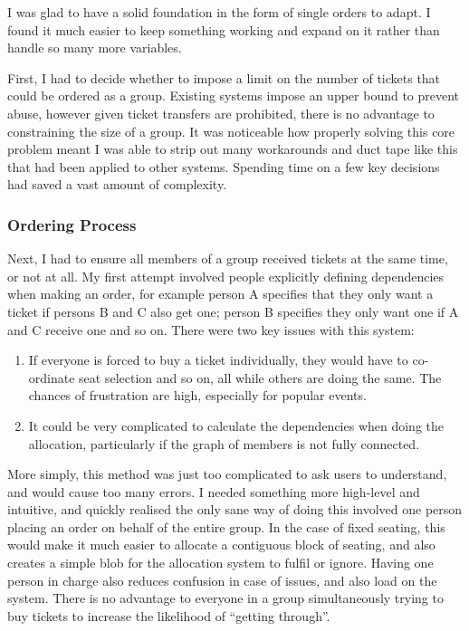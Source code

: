 \documentclass[12pt,a4]{bhamdissertation}
\begin{document}
I was glad to have a solid foundation in the form of single orders to adapt. I found it much easier to keep something working and expand on it rather than handle so many more variables.

First, I had to decide whether to impose a limit on the number of tickets that could be ordered as a group. Existing systems impose an upper bound to prevent abuse, however given ticket transfers are prohibited, there is no advantage to constraining the size of a group. It was noticeable how properly solving this core problem meant I was able to strip out many workarounds and duct tape like this that had been applied to other systems. Spending time on a few key decisions had saved a vast amount of complexity.

\subsubsection{Ordering Process}

Next, I had to ensure all members of a group received tickets at the same time, or not at all. My first attempt involved people explicitly defining dependencies when making an order, for example person A specifies that they only want a ticket if persons B and C also get one; person B specifies they only want one if A and C receive one and so on. There were two key issues with this system:

\begin{enumerate}
    \item If everyone is forced to buy a ticket individually, they would have to co-ordinate seat selection and so on, all while others are doing the same. The chances of frustration are high, especially for popular events.
    \item It could be very complicated to calculate the dependencies when doing the allocation, particularly if the graph of members is not fully connected.
\end{enumerate}

More simply, this method was just too complicated to ask users to understand, and would cause too many errors. I needed something more high-level and intuitive, and quickly realised the only sane way of doing this involved one person placing an order on behalf of the entire group. In the case of fixed seating, this would make it much easier to allocate a contiguous block of seating, and also creates a simple blob for the allocation system to fulfil or ignore. Having one person in charge also reduces confusion in case of issues, and also load on the system. There is no advantage to everyone in a group simultaneously trying to buy tickets to increase the likelihood of ``getting through''.
\end{document}
